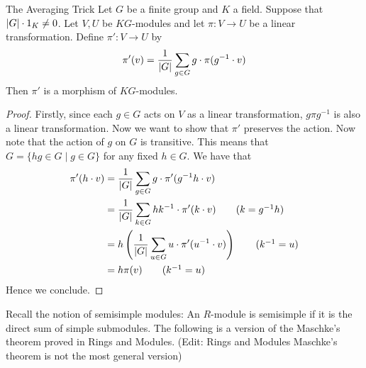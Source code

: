 \documentclass[a4paper]{article}
\begin{document}
\begin{lmm}{The Averaging Trick}{} Let $G$ be a finite group and $K$ a field. Suppose that $\abs{G}\cdot 1_K\neq 0$. Let $V,U$ be $KG$-modules and let $\pi:V\to U$ be a linear transformation. Define $\pi':V\to U$ by $$\pi'(v)=\frac{1}{\abs{G}}\sum_{g\in G}g\cdot\pi(g^{-1}\cdot v)$$ Then $\pi'$ is a morphism of $KG$-modules. \tcbline
\begin{proof}
Firstly, since each $g\in G$ acts on $V$ as a linear transformation, $g\pi g^{-1}$ is also a linear transformation. Now we want to show that $\pi'$ preserves the action. Now note that the action of $g$ on $G$ is transitive. This means that $G=\{hg\in G\;|\;g\in G\}$ for any fixed $h\in G$. We have that 
\begin{align*}
\pi'(h\cdot v)&=\frac{1}{\abs{G}}\sum_{g\in G}g\cdot\pi'(g^{-1}h\cdot v)\\
&=\frac{1}{\abs{G}}\sum_{k\in G}hk^{-1}\cdot\pi'(k\cdot v)\tag{$k=g^{-1}h$}\\
&=h\left(\frac{1}{\abs{G}}\sum_{u\in G}u\cdot\pi'(u^{-1}\cdot v)\right)\tag{$k^{-1}=u$}\\
&=h\pi(v)\tag{$k^{-1}=u$}
\end{align*}
Hence we conclude. 
\end{proof}
\end{lmm}

Recall the notion of semisimple modules: An $R$-module is semisimple if it is the direct sum of simple submodules. The following is a version of the Maschke's theorem proved in Rings and Modules. (Edit: Rings and Modules Maschke's theorem is not the most general version)
\end{document}
